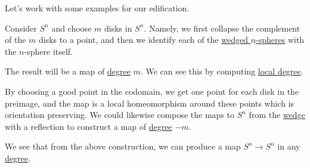 Let's work with some examples for our edification.

\begin{eg}
	Consider \(S^n\) and choose \(m\) disks in \(S^n\). Namely, we first collapse the complement of the \(m\) disks to a point, and then we identify each of the \hyperref[CW-complex-wedge-sum]{wedged \(n\)-spheres} with the \(n\)-sphere itself.
	\begin{figure}[H]
		\centering
		\label{fig:eg:degree-m-map-disks}
	\end{figure}
	The result will be a map of \hyperref[def:degree]{degree} \(m\). We can see this by computing \hyperref[def:local-degree]{local degree}.
	\begin{figure}[H]
		\centering
		\label{fig:eg:degree-m-map-disks-computation}
	\end{figure}
	By choosing a good point in the codomain, we get one point for each disk in the preimage, and the map is a local homeomorphism around these points which is orientation preserving. We could likewise compose the maps to \(S^n\) from the \hyperref[CW-complex-wedge-sum]{wedge} with a reflection to construct a map of \hyperref[def:degree]{degree} \(-m\).
\end{eg}
\begin{remark}
	We see that from the above construction, we can produce a map \(S^n \to S^n\) in any \hyperref[def:degree]{degree}.
\end{remark}